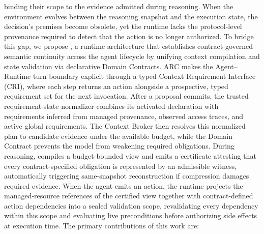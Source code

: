binding their scope to the evidence admitted during reasoning. When the environment evolves between the reasoning snapshot and
the execution state, the decision's premises become obsolete, yet the runtime lacks the protocol-level provenance required to
detect that the action is no longer authorized.
To bridge this gap, we propose \method{}, a runtime architecture that establishes contract-governed semantic continuity across
the agent lifecycle by unifying context compilation and state validation via declarative Domain Contracts.
ARC makes the Agent--Runtime turn boundary explicit through a typed Context Requirement Interface (CRI), where each step returns an action alongside a prospective,
typed requirement set for the next invocation. After a proposal commits, the trusted requirement-state normalizer combines its activated declaration with requirements inferred from
managed provenance, observed access traces, and active global requirements. The Context Broker then resolves this normalized plan to candidate evidence under the available budget,
while the Domain Contract prevents the model from weakening required obligations. During reasoning,
\method{} compiles a budget-bounded view and emits a certificate attesting that every contract-specified obligation is represented by
an admissible witness, automatically triggering same-snapshot reconstruction if compression damages required evidence.
When the agent emits an action, the runtime projects the managed-resource references of the certified view together with
contract-defined action dependencies into a sealed validation scope, revalidating every dependency within this scope and
evaluating live preconditions before authorizing side effects at execution time.
The primary contributions of this work are:
